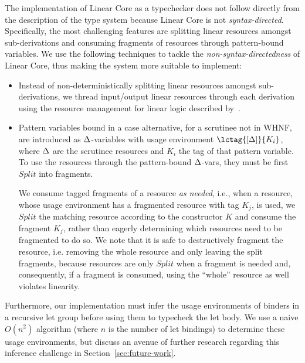 \documentclass[acmsmall, screen, review]{acmart}
\begin{document}
The implementation of Linear Core as a typechecker does not follow directly
from the description of the type system because Linear Core is not
\emph{syntax-directed}. Specifically, the most challenging features are
splitting linear resources amongst sub-derivations and consuming fragments of
resources through pattern-bound variables.
%
We use the following techniques to tackle the \emph{non-syntax-directedness} of
Linear Core, thus making the system more suitable to implement:
%
\begin{itemize}

\item Instead of non-deterministically splitting linear resources amongst
sub-derivations, we thread input/output linear resources through each
derivation using the resource management for linear logic described
by~\cite{DBLP:journals/tcs/CervesatoHP00}.

\item Pattern variables bound in a case alternative, for a scrutinee not in WHNF,
are introduced as $\Delta$-variables with usage environment $\lctag{\irr{\D}}{K_i}$,
where $\Delta$ are the scrutinee resources and $K_i$ the tag of that pattern
variable. To use the resources through the pattern-bound $\Delta$-vars, they must
be first $Split$ into fragments.

We consume tagged fragments of a resource \emph{as needed}, i.e., when a resource,
whose usage environment has a fragmented resource with tag $K_j$, is used, we $Split$
the matching resource according to the constructor $K$ and consume the fragment
$K_j$, rather than eagerly determining which resources need to be fragmented to
do so.
%
We note that it is safe to destructively fragment the resource, i.e. removing
the whole resource and only leaving the split fragments, because resources are
only $Split$ when a fragment is needed and, consequently, if a fragment is
consumed, using the ``whole'' resource as well violates linearity.

\end{itemize}
%
Furthermore, our implementation must infer the usage environments of binders in
a recursive let group before using them to typecheck the let body. We use a
naive $O(n^2)$ algorithm (where $n$ is the number of let bindings) to determine
these usage environments, but discuss an avenue of further research regarding
this inference challenge in Section~\ref{sec:future-work}.
\end{document}
